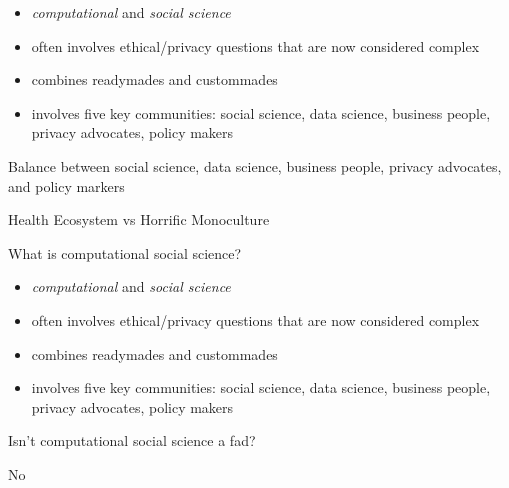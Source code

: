 \documentclass{beamer}
\def\vf{\vfill}
\begin{document}
\begin{frame}

\begin{itemize}
\item \emph{computational} and \emph{social science}
\item often involves ethical/privacy questions that are now considered complex
\item combines readymades and custommades
\pause
\item involves five key communities: social science, data science, business people, privacy advocates, policy makers
\end{itemize}

\end{frame}
\begin{frame}

\begin{center}
Balance between social science, data science, business people, privacy advocates, and policy markers\\
\end{center}
\vf
\begin{center}
Health Ecosystem vs Horrific Monoculture
\end{center}

\end{frame}
\begin{frame}

\begin{center}
\LARGE{What is computational social science?}
\end{center}

\begin{itemize}
\item \emph{computational} and \emph{social science}
\item often involves ethical/privacy questions that are now considered complex
\item combines readymades and custommades
\item involves five key communities: social science, data science, business people, privacy advocates, policy makers
\end{itemize}

\end{frame}
\begin{frame}

\begin{center}
\LARGE{Isn't computational social science a fad?}
\end{center}

\pause

No

\end{frame}
\end{document}
